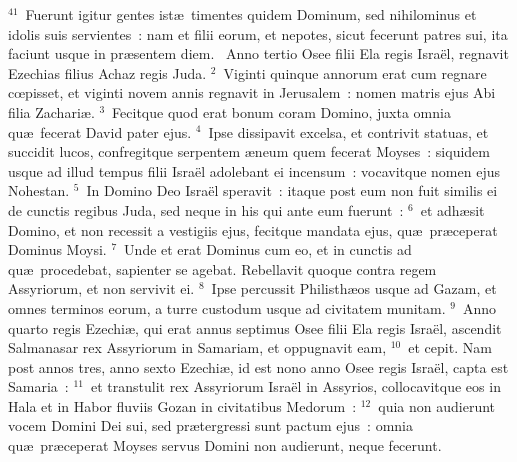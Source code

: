 ${}^{41}$~Fuerunt igitur gentes ist\ae\ timentes quidem Dominum, sed nihilominus et idolis suis servientes~: nam et filii eorum, et nepotes, sicut fecerunt patres sui, ita faciunt usque in pr\ae sentem diem.
~\lettrine[lines=10,image=true,loversize=0.05,lraise=-0.03]{A}{}nno tertio Osee filii Ela regis Isra\"el, regnavit Ezechias filius Achaz regis Juda.
${}^{2}$~Viginti quinque annorum erat cum regnare cœpisset, et viginti novem annis regnavit in Jerusalem~: nomen matris ejus Abi filia Zachari\ae .
${}^{3}$~Fecitque quod erat bonum coram Domino, juxta omnia qu\ae\ fecerat David pater ejus.
${}^{4}$~Ipse dissipavit excelsa, et contrivit statuas, et succidit lucos, confregitque serpentem \ae neum quem fecerat Moyses~: siquidem usque ad illud tempus filii Isra\"el adolebant ei incensum~: vocavitque nomen ejus Nohestan.
${}^{5}$~In Domino Deo Isra\"el speravit~: itaque post eum non fuit similis ei de cunctis regibus Juda, sed neque in his qui ante eum fuerunt~:
${}^{6}$~et adh\ae sit Domino, et non recessit a vestigiis ejus, fecitque mandata ejus, qu\ae\ pr\ae ceperat Dominus Moysi.
${}^{7}$~Unde et erat Dominus cum eo, et in cunctis ad qu\ae\ procedebat, sapienter se agebat. Rebellavit quoque contra regem Assyriorum, et non servivit ei.
${}^{8}$~Ipse percussit Philisth\ae os usque ad Gazam, et omnes terminos eorum, a turre custodum usque ad civitatem munitam.
${}^{9}$~Anno quarto regis Ezechi\ae , qui erat annus septimus Osee filii Ela regis Isra\"el, ascendit Salmanasar rex Assyriorum in Samariam, et oppugnavit eam,
${}^{10}$~et cepit. Nam post annos tres, anno sexto Ezechi\ae , id est nono anno Osee regis Isra\"el, capta est Samaria~:
${}^{11}$~et transtulit rex Assyriorum Isra\"el in Assyrios, collocavitque eos in Hala et in Habor fluviis Gozan in civitatibus Medorum~:
${}^{12}$~quia non audierunt vocem Domini Dei sui, sed pr\ae tergressi sunt pactum ejus~: omnia qu\ae\ pr\ae ceperat Moyses servus Domini non audierunt, neque fecerunt.


